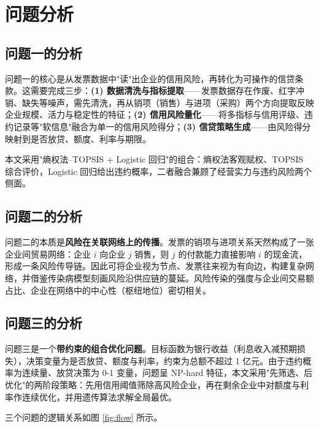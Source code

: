 \documentclass[12pt]{ctexart}
\begin{document}
\section{问题分析}

\subsection{问题一的分析}

问题一的核心是从发票数据中"读"出企业的信用风险，再转化为可操作的信贷条款。这需要完成三步：\textbf{(1) 数据清洗与指标提取}——发票数据存在作废、红字冲销、缺失等噪声，需先清洗，再从销项（销售）与进项（采购）两个方向提取反映企业规模、活力与稳定性的特征；\textbf{(2) 信用风险量化}——将多指标与信用评级、违约记录等"软信息"融合为单一的信用风险得分；\textbf{(3) 信贷策略生成}——由风险得分映射到是否放贷、额度、利率与期限。

本文采用"熵权法--TOPSIS + Logistic 回归"的组合：熵权法客观赋权、TOPSIS 综合评价，Logistic 回归给出违约概率，二者融合兼顾了经营实力与违约风险两个侧面。

\subsection{问题二的分析}

问题二的本质是\textbf{风险在关联网络上的传播}。发票的销项与进项关系天然构成了一张企业间贸易网络：企业 $i$ 向企业 $j$ 销售，则 $j$ 的付款能力直接影响 $i$ 的现金流，形成一条风险传导链。因此可将企业视为节点、发票往来视为有向边，构建复杂网络，并借鉴传染病模型刻画风险沿供应链的蔓延。风险传染的强度与企业间交易额占比、企业在网络中的中心性（枢纽地位）密切相关。

\subsection{问题三的分析}

问题三是一个\textbf{带约束的组合优化问题}。目标函数为银行收益（利息收入减预期损失），决策变量为是否放贷、额度与利率，约束为总额不超过 1 亿元。由于违约概率为连续量、放贷决策为 0-1 变量，问题呈 NP-hard 特征，本文采用"先筛选、后优化"的两阶段策略：先用信用阈值筛除高风险企业，再在剩余企业中对额度与利率作连续优化，并用遗传算法求解全局最优。

三个问题的逻辑关系如图 \ref{fig:flow} 所示。
\end{document}
